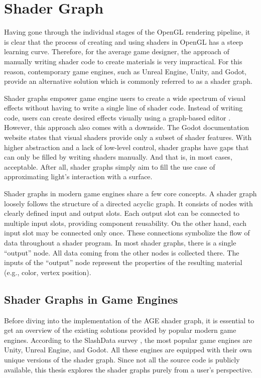 \documentclass[
  digital,     %
  oneside,     %
  nosansbold,  %
  nocolorbold, %
  lof,         %
  lot,         %
]{fithesis4}
\begin{document}
\chapter{Shader Graph}
Having gone through the individual stages of the OpenGL rendering pipeline, it is clear that the process of creating and using
shaders in OpenGL has a steep learning curve. Therefore, for the average game designer,
the approach of manually writing shader code to create materials is very impractical.
For this reason, contemporary game engines,
such as Unreal Engine, Unity, and Godot, provide an alternative solution which is commonly referred to as a shader graph.

Shader graphs empower game engine users to create a wide spectrum of visual effects without having to write a single
line of shader code. Instead of writing code, users can create desired effects visually using a graph-based editor
\cite{unity-shader-graph}. However, this approach also comes with a downside. The Godot documentation website
\cite{godot-visual-shaders} states that visual shaders provide only a subset of shader features.
With higher abstraction and a lack of low-level control, shader graphs have gaps that can only be filled
by writing shaders manually. And that is, in most cases, acceptable. After all, shader graphs simply
aim to fill the use case of approximating light's interaction with a surface.

Shader graphs in modern game engines share a few core concepts. A shader graph loosely follows the structure of
a directed acyclic graph. It consists of nodes with clearly defined input and output slots.
Each output slot can be connected to multiple input slots, providing component reusability.
On the other hand, each input slot may be connected only once. These connections symbolize the flow of data
throughout a shader program. In most shader graphs, there is a single \enquote{output} node.
All data coming from the other nodes is collected there. The inputs of the \enquote{output} node represent the properties
of the resulting material (e.g., color, vertex position).

\section{Shader Graphs in Game Engines}
Before diving into the implementation of the AGE shader graph, it is essential to get an overview of the existing solutions
provided by popular modern game engines. According to the SlashData survey \cite{slashdata-game-engines},
the most popular game engines are Unity, Unreal Engine, and Godot. All these engines are equipped with
their own unique versions of the shader graph. Since not all the source code is publicly
available, this thesis explores the shader graphs purely from a user's perspective.
\end{document}
